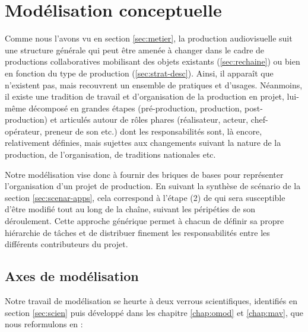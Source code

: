 \section{Modélisation conceptuelle}\label{sec:concept}

Comme nous l'avons vu en section \ref{sec:metier}, la production audiovisuelle suit une structure générale qui peut être amenée à changer dans le cadre de productions collaboratives mobilisant des objets existants (\ref{sec:rechaine}) ou bien en fonction du type de production (\ref{sec:strat-desc}).
Ainsi, il apparaît que  n'existent pas, mais recouvrent un ensemble de pratiques et d'usages.
Néanmoins, il existe une tradition de travail et d'organisation de la production en projet, lui-même décomposé en grandes étapes (pré-production, production, post-production) et articulés autour de rôles phares (réalisateur, acteur, chef-opérateur, preneur de son etc.) dont les responsabilités sont, là encore, relativement définies, mais sujettes aux changements suivant la nature de la production, de l'organisation, de traditions nationales etc.

Notre modélisation vise donc à fournir des briques de bases pour représenter l'organisation d'un projet de production.
En suivant la synthèse de scénario de la section \ref{sec:scenar-apps}, cela correspond à l'étape (2) de  qui sera susceptible d'être modifié tout au long de la chaîne, suivant les péripéties de son déroulement.
Cette approche générique permet à chacun de définir sa propre hiérarchie de tâches et de distribuer finement les responsabilités entre les différents contributeurs du projet.


\subsection{Axes de modélisation}
Notre travail de modélisation se heurte à deux verrous scientifiques, identifiés en section \ref{sec:scien} puis développé dans les chapitre \ref{chap:omod} et \ref{chap:mav}, que nous reformulons en : 


